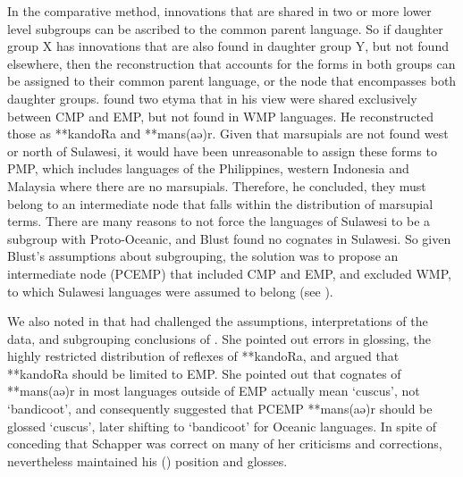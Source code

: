 In the comparative method,
innovations that are shared in two or more lower level subgroups
can be ascribed to the common parent language.
So if daughter group X has innovations that are also found in
daughter group Y, but not found elsewhere,
then the reconstruction that accounts for the forms in both groups
can be assigned to their common parent language,
or the node that encompasses both daughter groups.
\citet{Blust1982} found two etyma that in his view were shared
exclusively between CMP and EMP, but not found in WMP languages.
He reconstructed those as **kandoRa and **mans(aə)r.
Given that marsupials are not found west or north of Sulawesi,
it would have been unreasonable to assign these forms to PMP,
which includes languages of the Philippines,
western Indonesia and Malaysia where there are no marsupials.
Therefore, he concluded, they must belong to an intermediate
node that falls within the distribution of marsupial terms.
There are many reasons to not force the languages of Sulawesi
to be a subgroup with Proto-Oceanic,
and Blust found no cognates in Sulawesi.
So given Blust’s assumptions about subgrouping,
the solution was to propose an intermediate node (PCEMP) that
included CMP and EMP, and excluded WMP, to which Sulawesi languages were assumed
to belong (see ).

We also noted in  that \citet{Schapper2011} had
challenged the assumptions, interpretations of the data,
and subgrouping conclusions of \citet{Blust1982}.
She pointed out errors in glossing,
the highly restricted distribution of reflexes of **kandoRa,
and argued that **kandoRa should be limited to EMP.
She pointed out that cognates of **mans(aə)r in most languages
outside of EMP actually mean ‘cuscus’,
not ‘bandicoot’, and consequently suggested that PCEMP **mans(aə)r
should be glossed ‘cuscus’,
later shifting to ‘bandicoot’ for Oceanic languages.
In spite of conceding that Schapper was correct on many of her
criticisms and corrections, \citet{Blust2012b} nevertheless
maintained his (\citeyear{Blust1982}) position and glosses.

